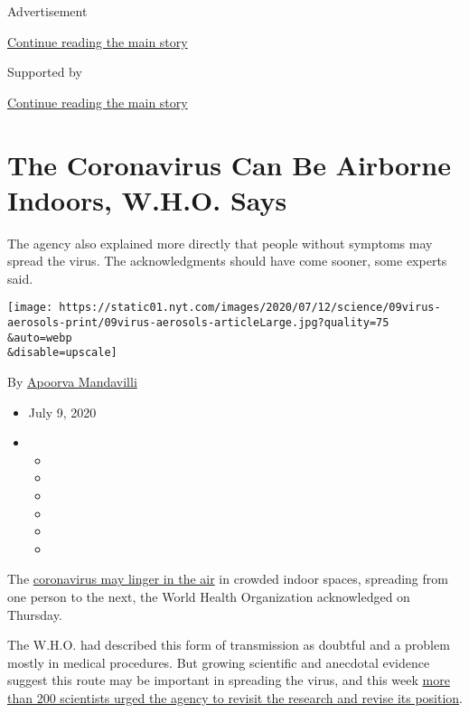 Advertisement

\protect\hyperlink{after-top}{Continue reading the main story}

Supported by

\protect\hyperlink{after-sponsor}{Continue reading the main story}

\hypertarget{the-coronavirus-can-be-airborne-indoors-who-says}{%
\section{The Coronavirus Can Be Airborne Indoors, W.H.O.
Says}\label{the-coronavirus-can-be-airborne-indoors-who-says}}

The agency also explained more directly that people without symptoms may
spread the virus. The acknowledgments should have come sooner, some
experts said.

\texttt{[image: https://static01.nyt.com/images/2020/07/12/science/09virus-aerosols-print/09virus-aerosols-articleLarge.jpg?quality=75\\\&auto=webp\\\&disable=upscale]}

By \href{https://www.nytimes.com/by/apoorva-mandavilli}{Apoorva
Mandavilli}

\begin{itemize}
\item
  July 9, 2020
\item
  \begin{itemize}
  \item
  \item
  \item
  \item
  \item
  \item
  \end{itemize}
\end{itemize}

The
\href{https://www.nytimes.com/2020/07/06/health/coronavirus-airborne-aerosols.html}{coronavirus
may linger in the air} in crowded indoor spaces, spreading from one
person to the next, the World Health Organization acknowledged on
Thursday.

The W.H.O. had described this form of transmission as doubtful and a
problem mostly in medical procedures. But growing scientific and
anecdotal evidence suggest this route may be important in spreading the
virus, and this week
\href{https://www.nytimes.com/2020/07/04/health/239-experts-with-one-big-claim-the-coronavirus-is-airborne.html}{more
than 200 scientists urged the agency to revisit the research and revise
its position}.

